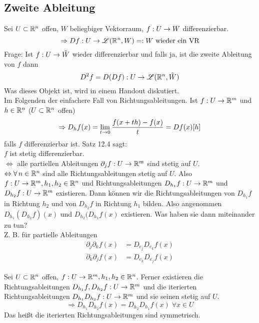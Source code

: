 \documentclass[../ana2.tex]{subfiles}
\begin{document}
\subsection{Zweite Ableitung}
Sei \(U \subset \mathbb{R}^n\) offen, \(W\) beliegbiger Vektorraum, \(f:U\rightarrow W\)
differenzierbar. \\
\[ \Rightarrow Df:U\rightarrow \mathscr{L}(\mathbb{R}^n, W) =: W \text{ wieder ein VR} \]
Frage: Ist \(f:U\rightarrow \tilde{W}\) wieder differenzierbar und falls ja,
ist die zweite Ableitung von \(f\) dann
\[ D^2f = D(Df):U\rightarrow \mathscr{L}(\mathbb{R}^n, \tilde{W})  \]
Was dieses Objekt ist, wird in einem Handout diskutiert.\\
Im Folgenden der einfachere Fall von Richtungsableitungen.
Ist \( f:U\rightarrow \mathbb{R}^m \) und \( h\in \mathbb{R}^n \) (\(U \subset \mathbb{R}^n\) offen)
\[ \Rightarrow D_h f(x) = \lim\limits_{t\rightarrow{}0} 
\frac{ f(x + th) - f(x) }{t} = Df(x)[h] \]
falls \(f\) differenzierbar ist.
Satz 12.4 sagt: \\
\(f\) ist stetig differenzierbar. \\
\(\Leftrightarrow\) alle partiellen Ableitungen 
\(\partial_j f:U\rightarrow \mathbb{R}^m\) sind stetig auf \(U\). \\
\(\Leftrightarrow \forall n \in \R^n\) sind 
alle Richtungsableitungen stetig auf \(U\).
Also \( f:U\rightarrow \mathbb{R}^m, h_1, h_2 \in \mathbb{R}^n \) und 
Richtungsableitungen \( D_{h_1}f:U\rightarrow \mathbb{R}^m \) 
und \( D_{h_2}f:U\rightarrow \mathbb{R}^m \) existieren.
Dann können wir die Richtungsableitungen von \(D_{h_1}f\) in Richtung
\(h_2\) und von \(D_{h_2}f\) in Richtung \(h_1\) bilden.
Also angenommen \( D_{h_1}(D_{h_2}f)(x) \) und \( D_{h_2}(D_{h_1}f(x) \)
existieren. Was haben sie dann miteinander zu tun? \\
Z. B. für partielle Ableitungen 
\begin{align*}
    \partial_j \partial_k f(x) &= D_{e_j}D_{e_k} f(x) \\
    \partial_k \partial_j f(x) &= D_{e_k} D_{e_j} f(x)
\end{align*}
\begin{satz}
    Sei \( U \subset \mathbb{R}^n \) offen, \( f:U\rightarrow \mathbb{R}^m, 
    h_1, h_2 \in \mathbb{R}^n \). Ferner existieren die 
    Richtungsableitungen \( D_{h_1}f, D_{h_2}f:U\rightarrow \mathbb{R}^m \) 
    und die iterierten Richtungsableitungen 
    \( D_{h_1}D_{h_2}f:U\rightarrow \mathbb{R}^m \) und sie seinen stetig
    auf \(U\).
    \[ \Rightarrow D_{h_1}D_{h_2} f(x) = D_{h_2}D_{h_1} f(x) 
    \; \forall x \in U \]
    Das heißt die iterierten Richtungsableitungen sind symmetrisch.
\end{satz}
\end{document}

